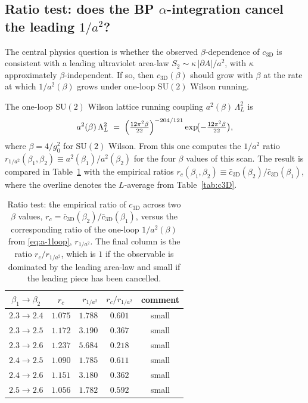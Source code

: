 \documentclass[11pt,a4paper]{article}
\theoremstyle{definition}
\newcommand{\SUtwo}{\mathrm{SU}(2)}
\newcommand{\threeD}{{3\text{D}}}
\begin{document}
\subsection{Ratio test: does the BP $\alpha$-integration cancel the
            leading $1/a^{2}$?}
\label{sec:ratios}

The central physics question is whether the observed
$\beta$-dependence of $c_{\threeD}$ is consistent with a leading
ultraviolet area-law $S_{2} \sim \kappa\,|\partial A|/a^{2}$, with
$\kappa$ approximately $\beta$-independent. If so, then
$c_{\threeD}(\beta)$ should grow with $\beta$ at the rate at which
$1/a^{2}(\beta)$ grows under one-loop $\SUtwo$ Wilson running.

The one-loop $\SUtwo$ Wilson lattice running coupling
$a^{2}(\beta)\,\Lambda_{L}^{2}$ is
\begin{equation}
   a^{2}(\beta)\,\Lambda_{L}^{2}
   \;=\; \Bigl(\tfrac{12\pi^{2}\beta}{22}\Bigr)^{-204/121}
         \exp\!\bigl(-\tfrac{12\pi^{2}\beta}{22}\bigr),
   \label{eq:a-1loop}
\end{equation}
where $\beta = 4/g_{0}^{2}$ for $\SUtwo$ Wilson. From this one
computes the $1/a^{2}$ ratio
$r_{1/a^{2}}(\beta_{1},\beta_{2}) \equiv
a^{2}(\beta_{1})/a^{2}(\beta_{2})$ for the four $\beta$ values of
this scan. The result is compared in
Table~\ref{tab:ratios} with the empirical ratios
$r_{c}(\beta_{1},\beta_{2}) \equiv
\bar c_{\threeD}(\beta_{2})/\bar c_{\threeD}(\beta_{1})$, where the
overline denotes the $L$-average from Table~\ref{tab:c3D}.

\begin{table}[tb]
\centering
\caption{Ratio test: the empirical ratio of $c_{\threeD}$ across two
$\beta$ values, $r_{c}=\bar c_{\threeD}(\beta_{2})/\bar
c_{\threeD}(\beta_{1})$, versus the corresponding ratio of the one-loop
$1/a^{2}(\beta)$ from \eqref{eq:a-1loop}, $r_{1/a^{2}}$. The final
column is the ratio $r_{c}/r_{1/a^{2}}$, which is $1$ if the
observable is dominated by the leading area-law and small if the
leading piece has been cancelled.}
\label{tab:ratios}
\renewcommand{\arraystretch}{1.15}
\begin{tabular}{ccrcc}
\toprule
$\beta_{1}\to\beta_{2}$ & $r_{c}$ & $r_{1/a^{2}}$\quad
                        & $r_{c} / r_{1/a^{2}}$ & comment\\
\midrule
$2.3\to 2.4$ & $1.075$ & $1.788$ & $0.601$ & small \\
$2.3\to 2.5$ & $1.172$ & $3.190$ & $0.367$ & small \\
$2.3\to 2.6$ & $1.237$ & $5.684$ & $0.218$ & small \\
$2.4\to 2.5$ & $1.090$ & $1.785$ & $0.611$ & small \\
$2.4\to 2.6$ & $1.151$ & $3.180$ & $0.362$ & small \\
$2.5\to 2.6$ & $1.056$ & $1.782$ & $0.592$ & small \\
\bottomrule
\end{tabular}
\end{table}
\end{document}
